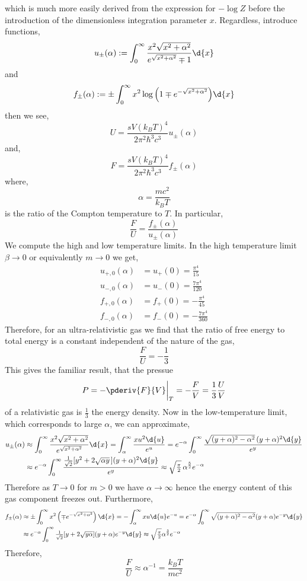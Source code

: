\documentclass[12pt]{article}
\begin{document}
which is much more easily derived from the expression for $-\log{Z}$ before the introduction of the dimensionless integration parameter $x$. Regardless, introduce functions,
\[ u_{\pm}(\alpha) := \int_0^\infty \frac{ x^2 \sqrt{x^2 + \alpha^2}}{e^{\sqrt{x^2 + \alpha^2}} \mp 1} \d{x} \]
and
\[ f_{\pm}(\alpha) := \pm \int_0^{\infty} x^2 \log{\left( 1 \mp e^{-\sqrt{x^2 + \alpha^2}} \right)} \d{x} \]
then we see,
\[ U = \frac{s V (k_B T)^4}{2 \pi^2 \hbar^3 c^3} u_{\pm}(\alpha) \]
and,
\[ F = \frac{s V (k_B T)^4}{2 \pi^2 \hbar^3 c^3} f_{\pm}(\alpha) \]
where,
\[ \alpha = \frac{m c^2}{k_B T} \]
is the ratio of the Compton temperature to $T$.
In particular,
\[ \frac{F}{U} = \frac{f_{\pm}(\alpha)}{u_{\pm}(\alpha)} \]
We compute the high and low temperature limits. In the high temperature limit $\beta \to 0$ or equivalently $m \to 0$ we get,
\begin{align*}
u_{+,0}(\alpha) & = u_{+}(0) = \frac{\pi^4}{15}
\\
u_{-,0}(\alpha) & = u_{-}(0) = \frac{7 \pi^4}{120}
\\
f_{+,0}(\alpha) & = f_{+}(0) = -\frac{\pi^4}{45}
\\
f_{-,0}(\alpha) & = f_{-}(0) = -\frac{7 \pi^4}{360}
\end{align*}
Therefore, for an ultra-relativistic gas we find that the ratio of free energy to total energy is a constant independent of the nature of the gas,
\[ \frac{F}{U} = - \frac{1}{3} \]
This gives the familiar result, that the pressue
\[ P = - \pderiv{F}{V} \bigg|_T = - \frac{F}{V} = \frac{1}{3} \frac{U}{V} \]
of a relativistic gas is $\frac{1}{3}$ the energy density. Now in the low-temperature limit, which corresponds to large $\alpha$, we can approximate,
\begin{align*}
u_{\pm}(\alpha) & \approx \int_0^{\infty} \frac{x^2 \sqrt{x^2 + \alpha^2}}{e^{\sqrt{x^2 + \alpha^2}}} \d{x} = \int_{\alpha}^{\infty} \frac{x u^2 \d{u}}{e^u} = e^{-\alpha} \int_0^{\infty} \frac{\sqrt{(y + \alpha)^2 - \alpha^2} \, (y + \alpha)^2 \d{y}}{e^y}
\\
& \approx e^{-\alpha} \int_0^{\infty} \frac{ \frac{1}{\sqrt{2}} [ y^2 + 2 \sqrt{\alpha y} \, ] (y + \alpha)^2 \d{y}}{e^y} \approx \sqrt{\tfrac{\pi}{2}} \, \alpha^{\frac{5}{2}} e^{-\alpha}
\end{align*}
Therefore as $T \to 0$ for $m > 0$ we have $\alpha \to \infty$ hence the energy content of this gas component freezes out. Furthermore,
\begin{align*}
f_{\pm}(\alpha) & \approx \pm \int_0^{\infty} x^2 \left( \mp e^{-\sqrt{x^2 + \alpha^2}} \right) \d{x} = - \int_{\alpha}^{\infty} x u \d{u} e^{-u} = e^{-\alpha} \int_0^{\infty} \sqrt{(y + \alpha)^2 - \alpha^2} (y + \alpha) e^{-y} \d{y} 
\\
& \approx e^{-\alpha} \int_0^{\infty} \tfrac{1}{\sqrt{2}} [y + 2 \sqrt{y \alpha}] (y + \alpha) e^{-y} \d{y} \approx \sqrt{\tfrac{\pi}{2}} \alpha^{\frac{3}{2}} e^{-\alpha} 
\end{align*}
Therefore, 
\[ \frac{F}{U} \approx \alpha^{-1} = \frac{k_B T}{m c^2} \]
\end{document}
